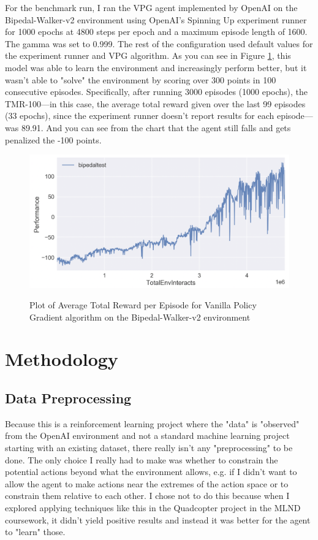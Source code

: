 \documentclass{article}
\begin{document}
For the benchmark run, I ran the VPG agent implemented by OpenAI on the Bipedal-Walker-v2 environment using OpenAI's Spinning Up experiment runner for 1000 epochs at 4800 steps per epoch and a maximum episode length of 1600. The gamma was set to 0.999. The rest of the configuration used default values for the experiment runner and VPG algorithm. As you can see in Figure \ref{fig:benchmark_results}, this model was able to learn the environment and increasingly perform better, but it wasn't able to "solve" the environment by scoring over 300 points in 100 consecutive episodes. Specifically, after running 3000 episodes (1000 epochs), the TMR-100—in this case, the average total reward given over the last 99 episodes (33 epochs), since the experiment runner doesn't report results for each episode—was 89.91. And you can see from the chart that the agent still falls and gets penalized the -100 points. 

\begin{figure}[ht]
\caption{Plot of Average Total Reward per Episode for Vanilla Policy Gradient algorithm on the Bipedal-Walker-v2 environment}
\centering
\includegraphics[scale=0.4]{images/bipedal-vpg-performance-plot.png}
\label{fig:benchmark_results}
\end{figure}


\section{Methodology}
\label{sec:methodology}

\subsection{Data Preprocessing}
Because this is a reinforcement learning project where the "data" is "observed" from the OpenAI environment and not a standard machine learning project starting with an existing dataset, there really isn't any "preprocessing" to be done. The only choice I really had to make was whether to constrain the potential actions beyond what the environment allows, e.g. if I didn't want to allow the agent to make actions near the extremes of the action space or to constrain them relative to each other. I chose not to do this because when I explored applying techniques like this in the Quadcopter project in the MLND coursework, it didn't yield positive results and instead it was better for the agent to "learn" those.
\end{document}
